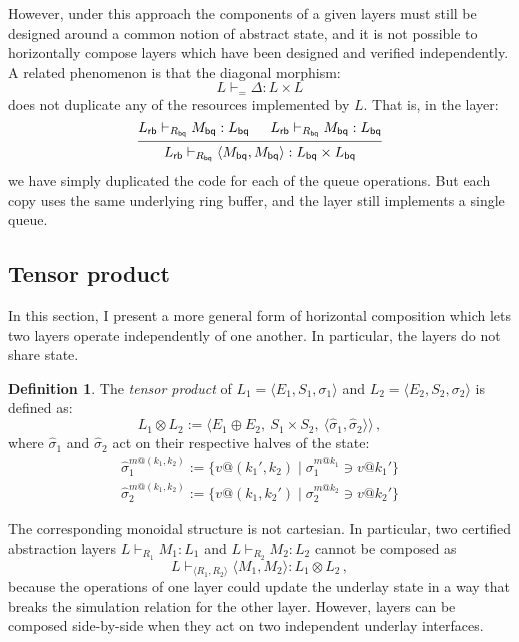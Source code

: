 \documentclass[11pt,oneside]{book}
\theoremstyle{definition}
\newtheorem{definition}[theorem]{Definition}
\newcommand{\kw}[1]{\ensuremath{ \mathsf{#1} }}
\begin{document}
However,
under this approach the components of a given layers
must still be designed around a common notion of abstract state,
and it is not possible to horizontally compose
layers which have been designed and verified independently.
A related phenomenon is
that the diagonal morphism:
\[
  L \vdash_{=} \Delta : L \times L
\]
does not duplicate any of the resources implemented by $L$.
That is, in the layer:
\[
  \begin{prooftree}
    \hypo{L_\kw{rb} \vdash_{R_\kw{bq}} M_\kw{bq} : L_\kw{bq}}
    \hypo{L_\kw{rb} \vdash_{R_\kw{bq}} M_\kw{bq} : L_\kw{bq}}
    \infer2{L_\kw{rb} \vdash_{R_\kw{bq}}
      \langle M_\kw{bq}, M_\kw{bq} \rangle :
      L_\kw{bq} \times L_\kw{bq}}
  \end{prooftree}
\]
we have simply duplicated the code for each of the queue operations.
But each copy uses the same underlying ring buffer,
and the layer still implements a single queue.


\subsection{Tensor product} \label{sec:layermon} %

In this section,
I present a more general form of horizontal composition
which lets two layers operate independently of one another.
In particular, the layers do not share state.

\begin{definition}
The \emph{tensor product} of
$L_1 = \langle E_1, S_1, \sigma_1 \rangle$ and
$L_2 = \langle E_2, S_2, \sigma_2 \rangle$
is defined as:
\[
  L_1 \otimes L_2 := \langle
    E_1 \oplus E_2, \:
    S_1 \times S_2, \:
    \langle \hat{\sigma}_1, \hat{\sigma}_2 \rangle
  \rangle \,,
\]
where $\hat{\sigma}_1$ and $\hat{\sigma}_2$
act on their respective halves of the state:
\begin{gather*}
  \hat{\sigma}_1^{m@(k_1, k_2)} :=
    \{ v@(k_1', k_2) \mid \sigma_1^{m@k_1} \ni v@k_1' \} \\
  \hat{\sigma}_2^{m@(k_1, k_2)} :=
    \{ v@(k_1, k_2') \mid \sigma_2^{m@k_2} \ni v@k_2' \}
\end{gather*}
\end{definition}

The corresponding monoidal structure is not cartesian.
In particular, two certified abstraction layers
$L \vdash_{R_1} M_1 : L_1$ and
$L \vdash_{R_2} M_2 : L_2$
cannot be composed as
\[
  L \vdash_{\langle R_1, R_2 \rangle} \langle M_1, M_2 \rangle : L_1 \otimes L_2
  \,,
\]
because the operations of one layer could update the underlay state
in a way that breaks the simulation relation for the other layer.
However, layers can be composed side-by-side
when they act on two independent underlay interfaces.
\end{document}
